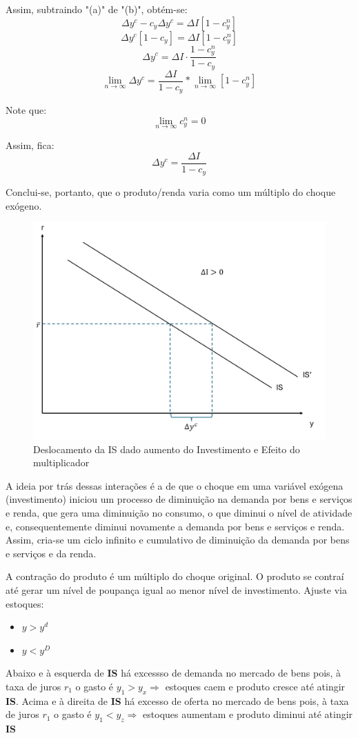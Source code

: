 \documentclass[a4paper,12pt]{article}[abntex2]
\begin{document}
Assim, subtraindo "(a)" de "(b)", obtém-se:
\[
\Delta y^c - c_y \Delta y^c = \Delta I [1 - c_y^n]
\]
\[
\Delta y^c [1 - c_y] = \Delta I [1 - c_y^n]
\]
\[
\Delta y^c = \Delta I \cdot \frac{1 - c_y^n}{1 - c_y}
\]
\[
\lim_{n \to \infty} \Delta y^c = \frac{\Delta I}{1 - c_y} * \lim_{n \to \infty} \left[1 - c_y^n\right]
\]

Note que:
\[
\lim_{n \to \infty} c_y^n = 0
\]

Assim, fica:
\[
\Delta y^c = \frac{\Delta I}{1 - c_y}
\]

Conclui-se, portanto, que o produto/renda varia como um múltiplo do choque exógeno.
\begin{figure}[H]
    \centering
    \caption{Deslocamento da IS dado aumento do Investimento e Efeito do multiplicador}
    \includegraphics[width=0.7\linewidth]{Imagens/a2i6.png}
\end{figure}

A ideia por trás dessas interações é a de que o choque em uma variável exógena (investimento) iniciou um processo de diminuição na demanda por bens e serviços e renda, que gera uma diminuição no consumo, o que diminui o nível de atividade e, consequentemente diminui novamente a demanda por bens e serviços e renda. Assim, cria-se um ciclo infinito e cumulativo de diminuição da demanda por bens e serviços e da renda. 

A contração do produto é um múltiplo do choque original. O produto se contraí até gerar um nível de poupança igual ao menor nível de investimento. Ajuste via estoques: \begin{itemize}
    \item $y>y^d$ 
    \item $y<y^D$
\end{itemize}

Abaixo e à esquerda de \textbf{IS} há excessso de demanda no mercado de bens pois, à taxa de juros $r_1$ o gasto é $y_1>y_x \Rightarrow$ estoques caem e produto cresce até atingir \textbf{IS}. Acima e à direita de \textbf{IS} há excesso de oferta no mercado de bens pois, à taxa de juros $r_1$ o gasto é $y_1<y_z \Rightarrow$ estoques aumentam e produto diminui até atingir \textbf{IS}
\end{document}
